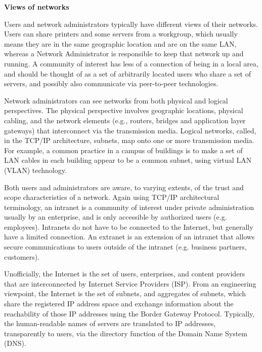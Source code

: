 \documentclass[a4paper]{article}
\begin{document}
\begin{enumerate}[label={\textbf{\Roman*.}},leftmargin=0pt,itemindent=*]
  \newpage


    \begin{center}
      \textbf{Views of networks}
    \end{center}

    Users and network administrators typically have different views of their
    networks. Users can share printers and some servers from a workgroup, which
    usually means they are in the same geographic location and are on the same
    LAN, whereas a Network Administrator is responsible to keep that network up
    and running. A community of interest has less of a connection of being in a
    local area, and should be thought of as a set of arbitrarily located users
    who share a set of servers, and possibly also communicate via peer-to-peer
    technologies.

    Network administrators can see networks from both physical and logical
    perspectives. The physical perspective involves geographic locations,
    physical cabling, and the network elements (e.g., routers, bridges and
    application layer gateways) that interconnect via the transmission media.
    Logical networks, called, in the TCP/IP architecture, subnets, map onto one
    or more transmission media. For example, a common practice in a campus of
    buildings is to make a set of LAN cables in each building appear to be a
    common subnet, using virtual LAN (VLAN) technology.

    Both users and administrators are aware, to varying extents, of the trust
    and scope characteristics of a network. Again using TCP/IP architectural
    terminology, an intranet is a community of interest under private
    administration usually by an enterprise, and is only accessible by
    authorized users (e.g. employees). Intranets do not have to be connected to
    the Internet, but generally have a limited connection. An extranet is an
    extension of an intranet that allows secure communications to users outside
    of the intranet (e.g. business partners, customers).

    Unofficially, the Internet is the set of users, enterprises, and content
    providers that are interconnected by Internet Service Providers (ISP). From
    an engineering viewpoint, the Internet is the set of subnets, and aggregates
    of subnets, which share the registered IP address space and exchange
    information about the reachability of those IP addresses using the Border
    Gateway Protocol. Typically, the human-readable names of servers are
    translated to IP addresses, transparently to users, via the directory
    function of the Domain Name System (DNS).


\end{enumerate}
\end{document}
